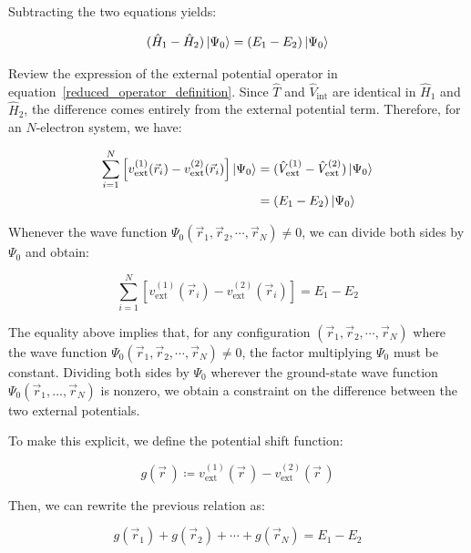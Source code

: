 Subtracting the two equations yields:

\begin{equation}
    (\hat{H}_1-\hat{H}_2)\ket{\Psi_0}=(E_1-E_2)\ket{\Psi_0}
\label{difference_eigen}
\end{equation}

Review the expression of the external potential operator in equation~\eqref{reduced_operator_definition}.
Since $\hat{T}$ and $\hat{V}_\mathrm{int}$ are identical in $\hat{H}_1$ and $\hat{H}_2$, the difference comes entirely from the external potential term.
Therefore, for an $N$-electron system, we have:

\begin{equation}
\begin{aligned}
    \sum_{i=1}^N\left[v_\mathrm{ext}^{(1)}(\vec{r}_i)-v_\mathrm{ext}^{(2)}(\vec{r}_i)\right]\ket{\Psi_0}
    &= (\hat{V}_\mathrm{ext}^{(1)}-\hat{V}_\mathrm{ext}^{(2)})\ket{\Psi_0} \\
    &= (E_1-E_2)\ket{\Psi_0}
\end{aligned}
\label{energy_difference}
\end{equation}

Whenever the wave function $\Psi_0(\vec{r}_1,\vec{r}_2,\cdots,\vec{r}_N)\neq 0$, we can divide both sides by $\Psi_0$ and obtain:

\begin{equation}
    \sum_{i=1}^N\left[v_\mathrm{ext}^{(1)}(\vec{r}_i)-v_\mathrm{ext}^{(2)}(\vec{r}_i)\right]=E_1-E_2
\label{difference_energy_nowave}
\end{equation}

The equality above implies that, for any configuration $(\vec{r}_1,\vec{r}_2,\cdots,\vec{r}_N)$ where the wave function $\Psi_0(\vec{r}_1,\vec{r}_2,\cdots,\vec{r}_N)\neq 0$, the factor multiplying $\Psi_0$ must be constant.
Dividing both sides by $\Psi_0$ wherever the ground-state wave function $\Psi_0(\vec{r}_1,\ldots,\vec{r}_N)$ is nonzero, we obtain a constraint on the difference between the two external potentials.

To make this explicit, we define the potential shift function:

\begin{equation}
    g(\vec{r}\,)\coloneqq v_\mathrm{ext}^{(1)}(\vec{r}\,)-v_\mathrm{ext}^{(2)}(\vec{r}\,)
\label{shift_potential}
\end{equation}

Then, we can rewrite the previous relation as:

\begin{equation}
    g(\vec{r}_1)+g(\vec{r}_2)+\cdots+g(\vec{r}_N)=E_1-E_2
\label{N-body_shift_potential}
\end{equation}

